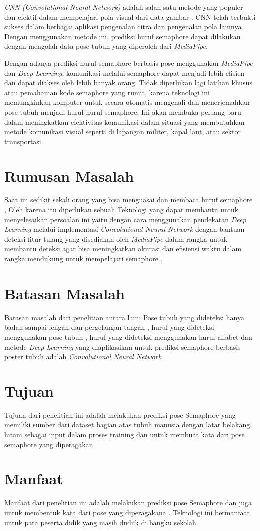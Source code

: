 \textit{CNN (Convolutional Neural Network)} adalah salah satu metode yang populer dan efektif dalam mempelajari pola visual dari data gambar \cite{lecun2015deep}. CNN telah terbukti sukses dalam berbagai aplikasi pengenalan citra dan pengenalan pola lainnya \cite{kim2023human}. Dengan menggunakan metode ini, prediksi huruf semaphore dapat dilakukan dengan mengolah data pose tubuh yang diperoleh dari \textit{MediaPipe}. 

Dengan adanya prediksi huruf semaphore berbasis pose menggunakan \textit{MediaPipe} dan \textit{Deep Learning}, komunikasi melalui semaphore dapat menjadi lebih efisien dan dapat diakses oleh lebih banyak orang. Tidak diperlukan lagi latihan khusus atau pemahaman kode semaphore yang rumit, karena teknologi ini memungkinkan komputer untuk secara otomatis mengenali dan menerjemahkan pose tubuh menjadi huruf-huruf semaphore. Ini akan membuka peluang baru dalam meningkatkan efektivitas komunikasi dalam situasi yang membutuhkan metode komunikasi visual seperti di lapangan militer, kapal laut, atau sektor transportasi.


\section{Rumusan Masalah}

Saat ini sedikit sekali orang yang bisa menguasai dan membaca huruf semaphore , Oleh karena itu diperlukan sebuah Teknologi yang dapat membantu untuk menyelesaikan persoalan ini yaitu dengan cara menggunakan pendekatan \textit{Deep Learning} melalui implementasi \textit{Convolutional Neural Network} dengan bantuan deteksi fitur tulang yang disediakan oleh \textit{MediaPipe} dalam rangka untuk membantu deteksi agar bisa meningkatkan akurasi dan efisiensi waktu dalam rangka mendukung untuk mempelajari semaphore .


\section{Batasan Masalah}
Batasan masalah dari penelitian antara lain; Pose tubuh yang dideteksi hanya badan sampai lengan dan pergelangan tangan , huruf yang dideteksi menggunakan pose tubuh , huruf yang dideteksi menggunakan huruf alfabet dan metode  \textit{Deep Learning} yang diaplikasikan untuk prediksi semaphore berbasis poster tubuh adalah \textit{Convolutional Neural Network}
 

\section{Tujuan}
Tujuan dari penelitian ini adalah melakukan prediksi pose Semaphore yang memiliki sumber dari dataset bagian atas tubuh manusia dengan latar belakang hitam sebagai input dalam proses training dan untuk membuat kata dari pose semaphore yang diperagakan

\section{Manfaat}
Manfaat dari penelitian ini adalah melakukan prediksi pose Semaphore dan juga untuk membentuk kata dari pose yang diperagakana . Teknologi ini bermanfaat untuk para peserta didik yang masih duduk di bangku sekolah